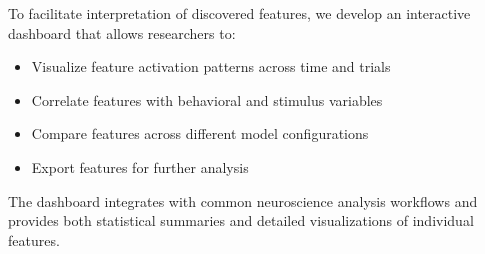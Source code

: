 To facilitate interpretation of discovered features, we develop an interactive dashboard that allows researchers to:
\begin{itemize}
\item Visualize feature activation patterns across time and trials
\item Correlate features with behavioral and stimulus variables
\item Compare features across different model configurations
\item Export features for further analysis
\end{itemize}

The dashboard integrates with common neuroscience analysis workflows and provides both statistical summaries and detailed visualizations of individual features.
